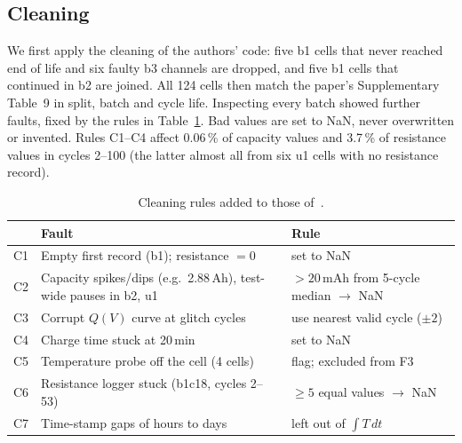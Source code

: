 \subsection{Cleaning}
We first apply the cleaning of the authors' code: five b1 cells that never
reached end of life and six faulty b3 channels are dropped, and five b1 cells
that continued in b2 are joined. All 124 cells then match the paper's
Supplementary Table~9 in split, batch and cycle life. Inspecting every batch
showed further faults, fixed by the rules in Table~\ref{tab:cleaning}. Bad
values are set to NaN, never overwritten or invented. Rules C1--C4 affect
0.06\,\% of capacity values and 3.7\,\% of resistance values in cycles
2--100 (the latter almost all from six u1 cells with no resistance record).

\begin{table}[!htb]
\centering
\caption{Cleaning rules added to those of~\cite{severson2019}.}
\label{tab:cleaning}
\small
\setlength{\tabcolsep}{2.5pt}
\begin{tabular}{@{}l>{\raggedright\arraybackslash}p{}>{\raggedright\arraybackslash}p{}@{}}
\toprule
& Fault & Rule \\
\midrule
C1 & Empty first record (b1); resistance $=0$ & set to NaN \\
C2 & Capacity spikes/dips (e.g.\ 2.88\,Ah), test-wide pauses in b2, u1 & $>20$\,mAh from 5-cycle median $\to$ NaN \\
C3 & Corrupt $Q(V)$ curve at glitch cycles & use nearest valid cycle ($\pm2$) \\
C4 & Charge time stuck at 20\,min & set to NaN \\
C5 & Temperature probe off the cell (4 cells) & flag; excluded from F3 \\
C6 & Resistance logger stuck (b1c18, cycles 2--53) & $\ge5$ equal values $\to$ NaN \\
C7 & Time-stamp gaps of hours to days & left out of $\int T\,dt$ \\
\bottomrule
\end{tabular}
\end{table}

